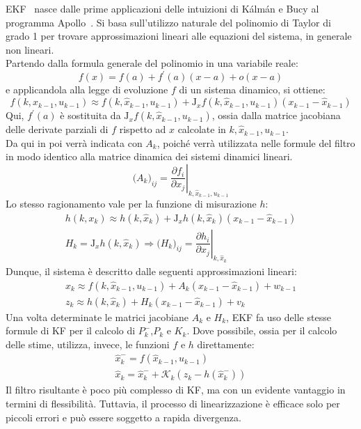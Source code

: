 \documentclass[12pt,a4paper,openright,twoside]{book}
\begin{document}
EKF~\cite{WelchB95} nasce dalle prime applicazioni delle intuizioni di Kálmán e Bucy al programma Apollo~\cite{smith1962}. Si basa sull'utilizzo naturale del polinomio di Taylor di grado 1 per trovare approssimazioni lineari alle equazioni del sistema, in generale non lineari. \\
Partendo dalla formula generale del polinomio in una variabile reale:
\begin{equation*}
f(x)=f(a)+f^\prime(a)(x-a)+o(x-a)
\end{equation*}
e applicandola alla legge di evoluzione $f$ di un sistema dinamico, si ottiene:
\begin{equation*}
f(k,x_{k-1},u_{k-1})\approx f(k,\hat{x}_{k-1},u_{k-1})+\mathrm{J}_xf(k,\hat{x}_{k-1},u_{k-1})(x_{k-1}-\hat{x}_{k-1})
\end{equation*}
Qui, $f^\prime(a)$ è sostituita da $\mathrm{J}_xf(k,\hat{x}_{k-1},u_{k-1})$, ossia dalla matrice jacobiana delle derivate parziali di $f$ rispetto ad $x$ calcolate in $k,\hat{x}_{k-1},u_{k-1}$. \\
Da qui in poi verrà indicata con $A_k$, poiché verrà utilizzata nelle formule del filtro in modo identico alla matrice dinamica dei sistemi dinamici lineari.
\begin{equation*}
\bigl(A_k\bigr)_{ij}=\left.\dfrac{\partial f_i}{\partial x_j}\right\vert_{k,\hat{x}_{k-1},u_{k-1}}
\end{equation*}
Lo stesso ragionamento vale per la funzione di misurazione $h$:
\begin{gather*}
h(k,x_k)\approx h(k,\hat{x}_k)+\mathrm{J}_xh(k,\hat{x}_k)(x_{k-1}-\hat{x}_{k-1}) \\
H_k=\mathrm{J}_xh(k,\hat{x}_k)\Rightarrow\bigl(H_k\bigr)_{ij}=\left.\dfrac{\partial h_i}{\partial x_j}\right\vert_{k,\hat{x}_k}
\end{gather*}
Dunque, il sistema è descritto dalle seguenti approssimazioni lineari:
\begin{gather*}
x_k\approx f(k,\hat{x}_{k-1},u_{k-1})+A_k(x_{k-1}-\hat{x}_{k-1})+w_{k-1} \\
z_k\approx h(k,\hat{x}_k)+H_k(x_{k-1}-\hat{x}_{k-1})+v_k
\end{gather*}
Una volta determinate le matrici jacobiane $A_k$ e $H_k$, EKF fa uso delle stesse formule di KF per il calcolo di $P_k^-$,$P_k$ e $K_k$. Dove possibile, ossia per il calcolo delle stime, utilizza, invece, le funzioni $f$ e $h$ direttamente:
\begin{gather*}
\hat{x}_k^-=f(\hat{x}_{k-1},u_{k-1}) \\
\hat{x}_k=\hat{x}_k^-+\mathcal{K}_k(z_k-h(\hat{x}_k^-))
\end{gather*}
Il filtro risultante è poco più complesso di KF, ma con un evidente vantaggio in termini di flessibilità. Tuttavia, il processo di linearizzazione è efficace solo per piccoli errori e può essere soggetto a rapida divergenza. \\
\end{document}
